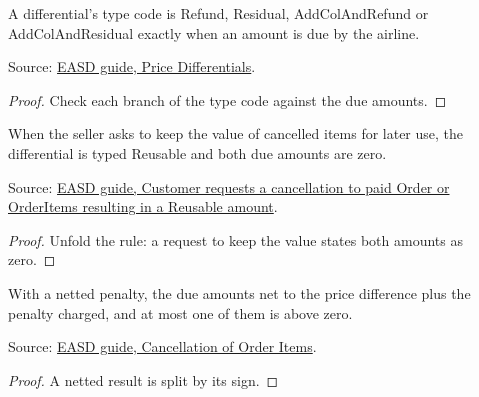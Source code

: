 \begin{theorem}
  \label{thm:change-cancellation-type-pays}
  A differential's type code is Refund, Residual, AddColAndRefund or
  AddColAndResidual exactly when an amount is due by the airline.

  Source: \href{https://standards.atlassian.net/wiki/spaces/EASD/pages/574554213/Price+Differentials}{EASD guide, Price Differentials}.
\end{theorem}
\begin{proof}
  Check each branch of the type code against the due amounts.
\end{proof}

\begin{theorem}
  \label{thm:change-cancellation-respend-reusable}
  When the seller asks to keep the value of cancelled items for later use, the
  differential is typed Reusable and both due amounts are zero.

  Source: \href{https://standards.atlassian.net/wiki/spaces/EASD/pages/817594921}{EASD guide, Customer requests a cancellation to paid Order or OrderItems resulting in a Reusable amount}.
\end{theorem}
\begin{proof}
  Unfold the rule: a request to keep the value states both amounts as zero.
\end{proof}

\begin{theorem}
  \label{thm:change-cancellation-netted-one-amount}
  With a netted penalty, the due amounts net to the price difference plus the
  penalty charged, and at most one of them is above zero.

  Source: \href{https://standards.atlassian.net/wiki/spaces/EASD/pages/574783569/Cancellation+of+Order+Items}{EASD guide, Cancellation of Order Items}.
\end{theorem}
\begin{proof}
  A netted result is split by its sign.
\end{proof}

